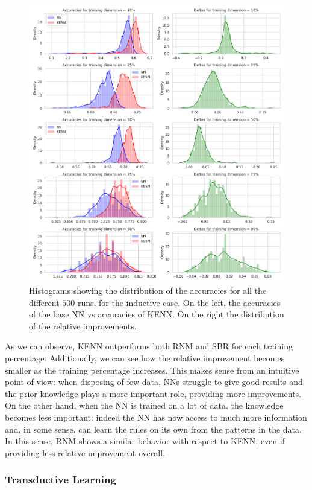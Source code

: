 \begin{figure}
	\centering
	\includegraphics[width=0.95\linewidth]{figures/histograms_inductive.pdf}
	\caption{Histograms showing the distribution of the accuracies for all the different $500$ runs, for the inductive case. On the left, the accuracies of the base NN vs accuracies of KENN. On the right the distribution of the relative improvements.}
	\label{fig:inductive_histograms}
\end{figure}
As we can observe, KENN outperforms both RNM and SBR for each training percentage. Additionally, we can see how the relative improvement becomes smaller as the training percentage increases. This makes sense from an intuitive point of view: when disposing of few data, NNs struggle to give good results and the prior knowledge plays a more important role, providing more improvements. On the other hand, when the NN is trained on a lot of data, the knowledge becomes less important: indeed the NN has now access to much more information and, in some sense, can learn the rules on its own from the patterns in the data. In this sense, RNM shows a similar behavior with respect to KENN, even if providing less relative improvement overall.

\subsubsection{Transductive Learning}

